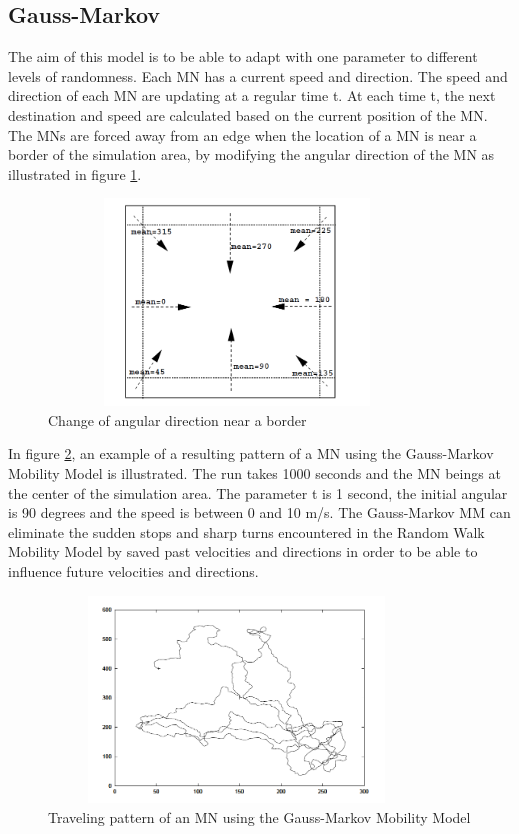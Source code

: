 \subsection{Gauss-Markov}

The aim of this model is to be able to adapt with one parameter to different levels of randomness. Each MN has a current speed and direction. The speed and direction of each MN are updating at a regular time t. At each time t, the next destination and speed are calculated based on the current position of the MN. The MNs are forced away from an edge when the location of a MN is near a border of the simulation area, by modifying the angular direction of the MN as illustrated in figure \ref{Gauss-MarkovFig1}.

\begin{figure}[h]
\center
\includegraphics[width=10cm,height=55mm]{../images/gauss-markovmodel1.png}
\caption{\label{Gauss-MarkovFig1} Change of angular direction near a border\cite{SurveyMobilityModelsAdHoc1}}
\end{figure}

In figure \ref{Gauss-MarkovFig2}, an example of a resulting pattern of a MN using the Gauss-Markov Mobility Model is illustrated. The run takes 1000 seconds and the MN beings at the center of the simulation area. The parameter t is 1 second, the initial angular is 90 degrees and the speed is between 0 and 10 m/s. The Gauss-Markov MM can eliminate the sudden stops and sharp turns encountered in the Random Walk Mobility Model by saved past velocities and directions in order to be able to influence future velocities and directions.

\begin{figure}[h]
\center
\includegraphics[width=10cm,height=55mm]{../images/gauss-markovmodel2.png}
\caption{\label{Gauss-MarkovFig2} Traveling pattern of an MN using the Gauss-Markov Mobility Model\cite{SurveyMobilityModelsAdHoc1}}
\end{figure}

